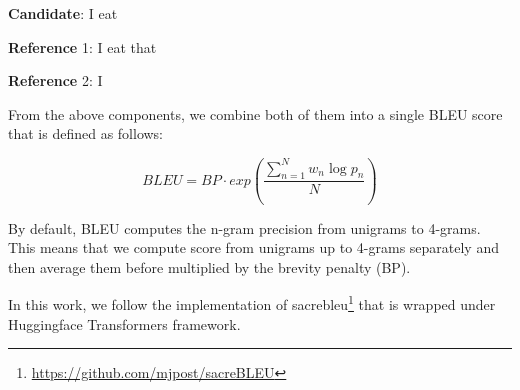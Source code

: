 \bigskip

\textbf{Candidate}: I eat

\textbf{Reference} 1: I eat that

\textbf{Reference} 2: I

\bigskip



From the above components, we combine both of them into a single BLEU score that is defined as follows:

\begin{equation}
    BLEU=BP\cdot exp\left( \frac{\sum_{n=1}^{N} w_n \log p_n}{N} \right)
\end{equation}

By default, BLEU computes the n-gram precision from unigrams to 4-grams. This means that we compute score from unigrams up to 4-grams separately and then average them before multiplied by the brevity penalty (BP).

In this work, we follow the implementation of sacrebleu\footnote{\url{https://github.com/mjpost/sacreBLEU}} that is wrapped under Huggingface Transformers framework.